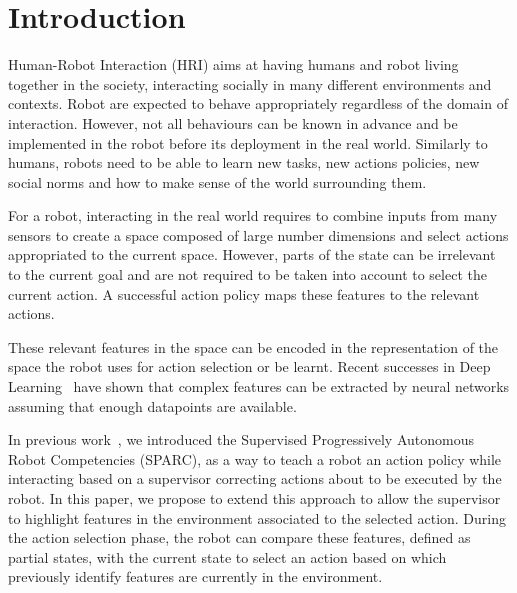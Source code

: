\documentclass[letterpaper]{article} %
\begin{document}
\section{Introduction}

Human-Robot Interaction (HRI) aims at having humans and robot living together
in the society, interacting socially in many different environments and
contexts. Robot are expected to behave appropriately regardless of the domain
of interaction. However, not all behaviours can be known in advance and be
implemented in the robot before its deployment in the real world. Similarly to
 humans, robots need
to be able to learn new tasks, new actions policies, new social norms and how
to make sense of the world surrounding them.

For a robot, interacting in the real world requires to combine inputs
 from many sensors to create a space composed of large number dimensions and
select actions appropriated to the current space. However,
 parts of the state can be irrelevant to the current goal and are not required
 to be taken into account to select the current action. A successful action
 policy maps these features to the relevant actions.

These relevant features in the space can be encoded in the representation of
the space the robot uses for action selection or be learnt. Recent successes in Deep
Learning~\cite{lecun2015deep} have shown that complex features can be extracted
by neural networks assuming that enough datapoints are available. 

In previous work~\cite{senft2015sparc,senft2017supervised}, we introduced the
Supervised Progressively Autonomous Robot Competencies (SPARC), as a way to
teach a robot an action policy while interacting based on a supervisor
correcting actions about to be executed by the robot. In this paper, we propose
to extend this approach to allow the supervisor to highlight features in the
environment associated to the selected action. During the action selection
phase, the robot can compare these features, defined as partial states, with the
current state to select an action based on which previously identify
features are currently in the environment.
\end{document}
